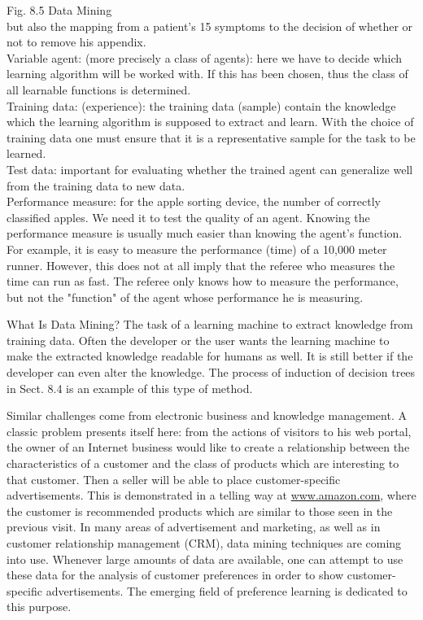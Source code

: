\documentclass[10pt]{article}
\begin{document}
Fig. 8.5 Data Mining\\
but also the mapping from a patient's 15 symptoms to the decision of whether or not to remove his appendix.\\
Variable agent: (more precisely a class of agents): here we have to decide which learning algorithm will be worked with. If this has been chosen, thus the class of all learnable functions is determined.\\
Training data: (experience): the training data (sample) contain the knowledge which the learning algorithm is supposed to extract and learn. With the choice of training data one must ensure that it is a representative sample for the task to be learned.\\
Test data: important for evaluating whether the trained agent can generalize well from the training data to new data.\\
Performance measure: for the apple sorting device, the number of correctly classified apples. We need it to test the quality of an agent. Knowing the performance measure is usually much easier than knowing the agent's function. For example, it is easy to measure the performance (time) of a 10,000 meter runner. However, this does not at all imply that the referee who measures the time can run as fast. The referee only knows how to measure the performance, but not the "function" of the agent whose performance he is measuring.

What Is Data Mining? The task of a learning machine to extract knowledge from training data. Often the developer or the user wants the learning machine to make the extracted knowledge readable for humans as well. It is still better if the\\
developer can even alter the knowledge. The process of induction of decision trees in Sect. 8.4 is an example of this type of method.


Similar challenges come from electronic business and knowledge management. A classic problem presents itself here: from the actions of visitors to his web portal, the owner of an Internet business would like to create a relationship between the characteristics of a customer and the class of products which are interesting to that customer. Then a seller will be able to place customer-specific advertisements. This is demonstrated in a telling way at \href{http://www.amazon.com}{www.amazon.com}, where the customer is recommended products which are similar to those seen in the previous visit. In many areas of advertisement and marketing, as well as in customer relationship management (CRM), data mining techniques are coming into use. Whenever large amounts of data are available, one can attempt to use these data for the analysis of customer preferences in order to show customer-specific advertisements. The emerging field of preference learning is dedicated to this purpose.
\end{document}
